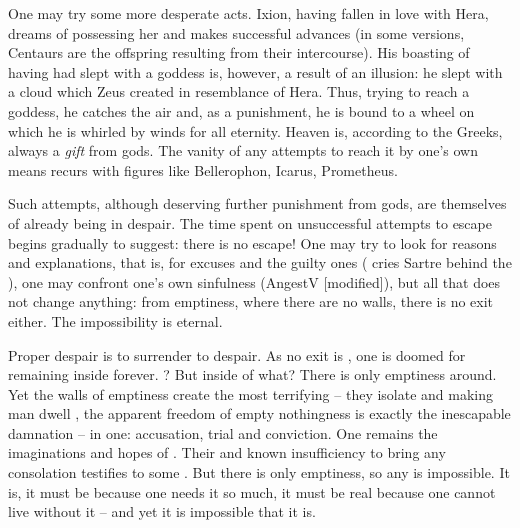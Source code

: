 \pa\label{noconsolation} One may try some more desperate acts. Ixion, having
fallen in love with Hera, dreams of possessing her and makes successful advances
(in some versions, Centaurs are the offspring resulting from their intercourse).
His boasting of having had slept with a goddess is, however, a result of an
illusion: he slept with a cloud which Zeus created in resemblance of Hera. Thus,
trying to reach a goddess, he catches the air and, as a punishment, he is bound
to a wheel on which he is whirled by winds for all eternity. Heaven is, according
to the Greeks, always a {\em gift} from gods. The vanity of any attempts to
reach it by one's own means recurs with figures like Bellerophon, Icarus,
Prometheus.

  
Such attempts, although deserving further punishment from gods, are themselves
 of already being in despair. The time spent on
unsuccessful attempts to escape begins gradually to suggest: there is no escape!
One may try to look for reasons and explanations, that is, for excuses and the
guilty ones ( cries Sartre behind the ), one may confront one's own sinfulness (\citet{Angst
discovers freedom but this is the same as discovery of sin}{Angest}{V
 [modified]}), but all that does not change anything:
from emptiness, where there are no walls, 
there is no exit either. The impossibility is eternal.

\label{properdespair}
Proper despair is to surrender to despair. As no exit is , one is
doomed 
for remaining inside forever. ? But inside of what?  There is only
emptiness around. Yet the walls of emptiness create the most terrifying
 -- they isolate and  making man dwell 
, the apparent freedom of empty nothingness is exactly the
inescapable damnation -- in one: accusation, trial and conviction.  One remains
 the imaginations and hopes of . Their
 and  known insufficiency to bring any consolation
testifies to some . But there is only emptiness, so any
 is impossible. It is, it must be because one needs it so much, it
must be real because one cannot live without it -- and
yet it is impossible that it is.


